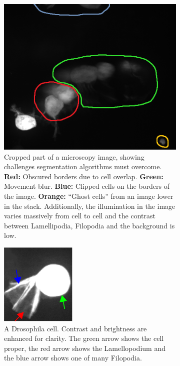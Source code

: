 \begin {figure}[!ht]	
	\centering
	\begin {subfigure}[t]{0.52\linewidth}
		\includegraphics[scale=0.60]{img/fig_problems.png}

		\caption*{Cropped part of a microscopy image, showing challenges segmentation algorithms must overcome. \textbf{Red:} Obscured borders due to cell overlap. \textbf{Green:} Movement blur. \textbf{Blue:} Clipped cells on the borders of the image. \textbf{Orange:} ``Ghost cells'' from an image lower in the stack. Additionally, the illumination in the image varies massively from cell to cell and the contrast between Lamellipodia, Filopodia and the background is low.}
	\end {subfigure}
	\hspace{1cm}
	\begin {subfigure}[t]{0.35\linewidth}
		\includegraphics[scale=1.0]{img/fig_cell_example.png}

		\caption*{A Drosophila cell. Contrast and brightness are enhanced for clarity. The green arrow shows the cell proper, the red arrow shows the Lamellopodium and the blue arrow shows one of many Filopodia.}
	\end {subfigure}

	\caption[]{}
	\label{fig:cell_example}
\end {figure}

